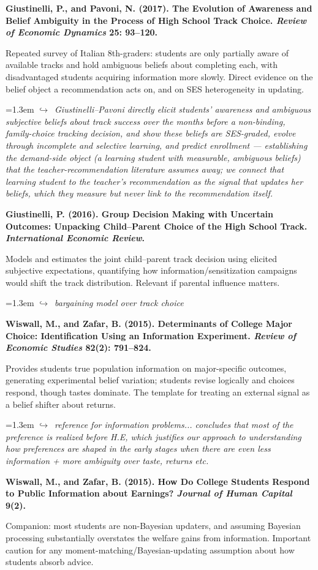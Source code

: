 \documentclass[11pt]{article}
\newcommand{\entry}[3]{%
  \par\medskip\noindent\textbf{#1}\par
  \nopagebreak #2\hspace{0.35em}{\small\color{tagcol}[#3]}\par}
\newcommand{\note}[1]{\par\smallskip\noindent\hangindent=1.3em
  \textcolor{notecol}{\footnotesize$\hookrightarrow$~\textit{#1}}}
\begin{document}
\entry{Giustinelli, P., and Pavoni, N. (2017). The Evolution of Awareness and Belief
Ambiguity in the Process of High School Track Choice. \textit{Review of Economic
Dynamics} 25: 93--120.}
{Repeated survey of Italian 8th-graders: students are only partially aware of available
tracks and hold ambiguous beliefs about completing each, with disadvantaged students
acquiring information more slowly. Direct evidence on the belief object a recommendation
acts on, and on SES heterogeneity in updating.}{RF / survey}
\note{Giustinelli–Pavoni directly elicit students' awareness and ambiguous subjective beliefs about track success over the months before a non-binding, family-choice tracking decision, and show these beliefs are SES-graded, evolve through incomplete and selective learning, and predict enrollment — establishing the demand-side object (a learning student with measurable, ambiguous beliefs) that the teacher-recommendation literature assumes away; we connect that learning student to the teacher's recommendation as the signal that updates her beliefs, which they measure but never link to the recommendation itself.}

\entry{Giustinelli, P. (2016). Group Decision Making with Uncertain Outcomes: Unpacking
Child--Parent Choice of the High School Track. \textit{International Economic Review}.}
{Models and estimates the joint child--parent track decision using elicited subjective
expectations, quantifying how information/sensitization campaigns would shift the track
distribution. Relevant if parental influence matters.}{STR / RF}
\note{bargaining model over track choice}

\entry{Wiswall, M., and Zafar, B. (2015). Determinants of College Major Choice:
Identification Using an Information Experiment. \textit{Review of Economic Studies}
82(2): 791--824.}
{Provides students true population information on major-specific outcomes, generating
experimental belief variation; students revise logically and choices respond, though
tastes dominate. The template for treating an external signal as a belief shifter about
returns.}{EXP}
\note{reference for information problems... concludes that most of the preference is realized before H.E, which justifies our approach to understanding how preferences are shaped in the early stages when there are even less information + more ambiguity over taste, returns etc.}

\entry{Wiswall, M., and Zafar, B. (2015). How Do College Students Respond to Public
Information about Earnings? \textit{Journal of Human Capital} 9(2).}
{Companion: most students are non-Bayesian updaters, and assuming Bayesian processing
substantially overstates the welfare gains from information. Important caution for any
moment-matching/Bayesian-updating assumption about how students absorb advice.}{EXP}
\end{document}
